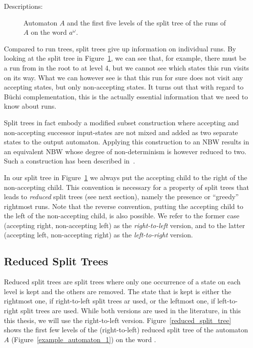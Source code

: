 Descriptions: \cite{vardi2007automata}

\begin{figure}
\centering
\SplitTreeRightLeft
\caption{Automaton $A$ and the first five levels of the split tree of the runs of $A$ on the word $a^\omega$.}
\label{split_tree}
\end{figure}

Compared to run trees, split trees give up information on individual runs. By looking at the split tree in Figure~\ref{split_tree}, we can see that, for example, there must be a run from  in the root to  at level 4, but we cannot see which states this run visits on its way. What we can however see is that this run for sure does not visit any accepting states, but only non-accepting states. It turns out that with regard to Büchi complementation, this is the actually essential information that we need to know about runs. 

Split trees in fact embody a modified subset construction where accepting and non-accepting successor input-states are not mixed and added as two separate states to the output automaton. Applying this construction to an NBW results in an equivalent NBW whose degree of non-determinism is however reduced to two. Such a construction has been described in~\cite{UltesNitsche2007107}.

In our split tree in Figure~\ref{split_tree} we always put the accepting child to the right of the non-accepting child. This convention is necessary for a property of split trees that leads to \textit{reduced} split trees (see next section), namely the presence or ``greedy'' rightmost runs. Note that the reverse convention, putting the accepting child to the left of the non-accepting child, is also possible. We refer to the former case (accepting right, non-accepting left) as the \textit{right-to-left} version, and to the latter (accepting left, non-accepting right) as the \textit{left-to-right} version.


\subsection{Reduced Split Trees}
Reduced split trees are split trees where only one occurrence of a state on each level is kept and the others are removed. The state that is kept is either the rightmost one, if right-to-left split trees ar used, or the leftmost one, if left-to-right split trees are used. While both versions are used in the literature, in this this thesis, we will use the right-to-left version. Figure~\ref{reduced_split_tree} shows the first few levels of the (right-to-left) reduced split tree of the automaton $A$ (Figure~\ref{example_automaton_1}) on the word \aom.

